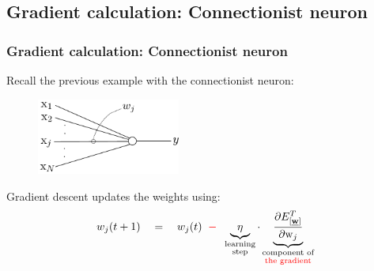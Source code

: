 \subsection{Gradient calculation: Connectionist neuron}

\begin{frame}\frametitle{Gradient calculation: Connectionist neuron}
    
    Recall the previous example with the connectionist neuron:
    
    \begin{figure}[h]
        \centering
        \includegraphics[height=2.5cm]{img/linearNeuron_y}
        \label{fig:neuron} 
    \end{figure}
    
    Gradient descent updates the weights using:
    \begin{equation}
    		w_{j}(t+1) \quad=\quad w_{j}(t) 
				\;\;{\color{red}-}\;\;
				\underbrace{{\eta}}_{ 
						\substack{\text{learning} \\ \text{step} } }
                        \cdot
				\underbrace{\frac{\partial {E}^T_{[\underline{\mathbf{w}}]}}{
					\partial \mathrm{w}_{j}}}_{
						\substack{
							\text{component of}\\
							\text{\textcolor{red}{the gradient}} 
			} }
    \end{equation}
    
\end{frame}
